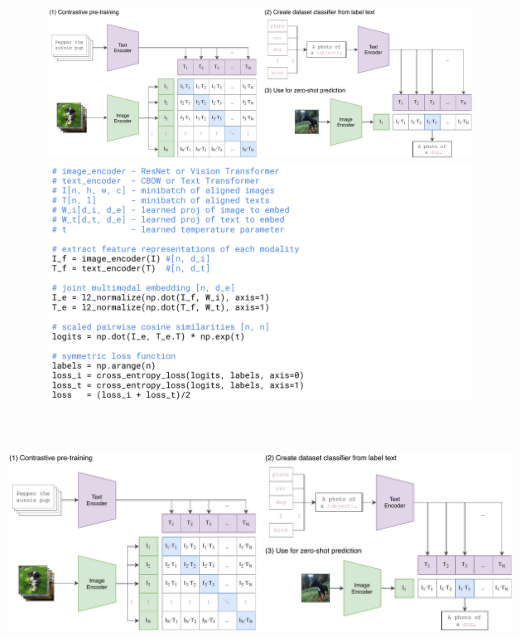 \begin{frame}
    \begin{figure}
        \includegraphics[width=.6\textwidth,trim={0 0 13.5cm 0},clip]{./images/main-diagrams}
        \includegraphics[width=.35\textwidth]{./images/pseudocode}
    \end{figure}
\end{frame}

\begin{frame}
    \centering
    \includegraphics[height=6.5cm,trim={13.5cm 0 0 0},clip]{./images/main-diagrams}
\end{frame}

